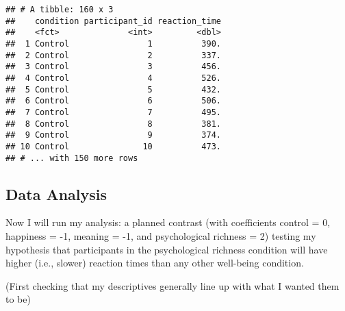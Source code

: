 \documentclass[
]{article}
\newenvironment{Shaded}{\begin{snugshade}}{\end{snugshade}}
\newcommand{\AttributeTok}[1]{\textcolor[rgb]{0.13,0.29,0.53}{#1}}
\newcommand{\CommentTok}[1]{\textcolor[rgb]{0.56,0.35,0.01}{\textit{#1}}}
\newcommand{\ConstantTok}[1]{\textcolor[rgb]{0.56,0.35,0.01}{#1}}
\newcommand{\FunctionTok}[1]{\textcolor[rgb]{0.13,0.29,0.53}{\textbf{#1}}}
\newcommand{\NormalTok}[1]{#1}
\newcommand{\OtherTok}[1]{\textcolor[rgb]{0.56,0.35,0.01}{#1}}
\newcommand{\SpecialCharTok}[1]{\textcolor[rgb]{0.81,0.36,0.00}{\textbf{#1}}}
\newcommand{\StringTok}[1]{\textcolor[rgb]{0.31,0.60,0.02}{#1}}
\begin{document}
\begin{Shaded}
\end{Shaded}

\begin{verbatim}
## # A tibble: 160 x 3
##    condition participant_id reaction_time
##    <fct>              <int>         <dbl>
##  1 Control                1          390.
##  2 Control                2          337.
##  3 Control                3          456.
##  4 Control                4          526.
##  5 Control                5          432.
##  6 Control                6          506.
##  7 Control                7          495.
##  8 Control                8          381.
##  9 Control                9          374.
## 10 Control               10          473.
## # ... with 150 more rows
\end{verbatim}

\hypertarget{data-analysis}{%
\subsection{Data Analysis}\label{data-analysis}}

Now I will run my analysis: a planned contrast (with coefficients
control = 0, happiness = -1, meaning = -1, and psychological richness =
2) testing my hypothesis that participants in the psychological richness
condition will have higher (i.e., slower) reaction times than any other
well-being condition.

(First checking that my descriptives generally line up with what I
wanted them to be)

\begin{Shaded}
\end{Shaded}
\end{document}
